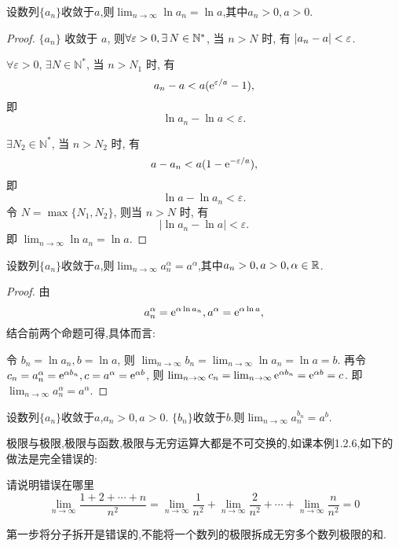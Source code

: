 \begin{proposition}
    设数列$\{a_n\}$收敛于$a$,则$\lim_{n \to \infty} \ln a_n = \ln a$,其中$a_n > 0, a > 0$.
\end{proposition}

\begin{proof}
    $\{ a_n \}$ 收敛于 $a$, 则$\forall \ve > 0, \exists N \in \mathbb{N}^*$, 当 $n > N$ 时, 有 $|a_n - a| < \varepsilon$.

    $\forall \varepsilon > 0$, $\exists N \in \mathbb{N}^*$, 当 $n > N_1$ 时, 有
    $$a_n - a < a(\mathrm{e}^{\varepsilon/a} - 1), $$
    即
    $$\ln a_n - \ln a < \varepsilon.$$

    $\exists N_2 \in \mathbb{N}^*$, 当 $n > N_2$ 时, 有
    $$a - a_n < a(1 - \mathrm{e}^{-\varepsilon/a}), $$
    即
    $$\ln a - \ln a_n < \varepsilon.$$
    令 $N = \max\{N_1, N_2\}$, 则当 $n > N$ 时, 有
    $$ |\ln a_n - \ln a| < \varepsilon.$$
    即 $\lim_{n \to \infty} \ln a_n = \ln a$.
\end{proof}

\begin{proposition}
    设数列$\{a_n\}$收敛于$a$,则$\lim_{n \to \infty} a_n^\alpha = a^\alpha$,其中$a_n > 0, a > 0,\alpha \in \mathbb{R}$.
\end{proposition}

\begin{proof}
    由$$a_n^\alpha = \mathrm{e}^{\alpha \ln a_n}, a^\alpha = \mathrm{e}^{\alpha \ln a}, $$结合前两个命题可得,具体而言:

    令 $b_n = \ln a_n, b = \ln a$, 则 $\lim_{n \to \infty} b_n = \lim_{n \to \infty} \ln a_n = \ln a = b$. 再令$c_n = a_n^\alpha = \mathrm{e}^{\alpha b_n}, c = a^\alpha = \mathrm{e}^{\alpha b}$, 则 $\lim_{n \to \infty} c_n = \lim_{n \to \infty} \mathrm{e}^{\alpha b_n} = \mathrm{e}^{\alpha b} = c$. 即 $\lim_{n \to \infty} a_n^\alpha = a^\alpha$.
\end{proof}

\begin{proposition}\label{prop:limit_power_sequence}
    设数列$\{a_n\}$收敛于$a$,$a_n > 0, a > 0$. $\{b_n\}$收敛于$b$.则$\lim_{n \to \infty} a_n^{b_n} = a^b$.
\end{proposition}

极限与极限,极限与函数,极限与无穷运算大都是不可交换的,如课本例1.2.6,如下的做法是完全错误的:
\begin{example}
    请说明错误在哪里
    $$
        \underset{n \rightarrow \infty}{\lim} \frac{1+2+\cdots+n}{n^2} =
        \underset{n \rightarrow \infty}{\lim} \frac{1}{n^2} +\underset{n \rightarrow \infty}{\lim} \frac{2}{n^2} + \cdots + \underset{n \rightarrow \infty}{\lim} \frac{n}{n^2} = 0
    $$

    \begin{solution}

        第一步将分子拆开是错误的,不能将一个数列的极限拆成无穷多个数列极限的和.

    \end{solution}
\end{example}

